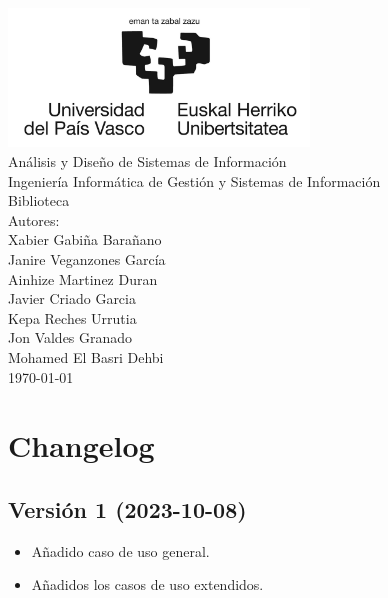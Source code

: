 ﻿\documentclass{report}
\begin{document}
    \begin{titlepage}
        \centering
        \includegraphics[width=0.6\textwidth]{./img/portada/logo.jpg}\\
        \vspace{1cm}
        \LARGE Análisis y Diseño de Sistemas de Información\\
        \vspace{0.5cm}
        \Large Ingeniería Informática de Gestión y Sistemas de Información\\
        \vspace{3cm}
        \Huge Biblioteca\\
        \vspace{2.5cm}
        \Large Autores:\\
        \vspace{0.2cm}
        \large Xabier Gabiña Barañano\\
        \large Janire Veganzones García\\
        \large Ainhize Martinez Duran\\
        \large Javier Criado Garcia\\
        \large Kepa Reches Urrutia\\
        \large Jon Valdes Granado\\
        \large Mohamed El Basri Dehbi\\
        \vfill
        \today
    \end{titlepage}

    \tableofcontents
    \chapter{Changelog}
        \section{Versión 1 (2023-10-08)}
            \begin{itemize}
                \item Añadido caso de uso general.
                \item Añadidos los casos de uso extendidos.
            \end{itemize}  
\end{document}
